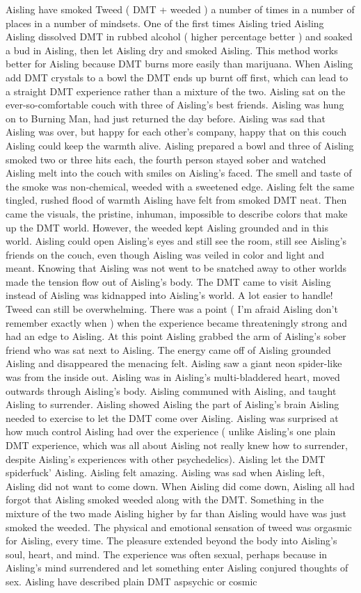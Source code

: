 \documentclass[12pt]{book}
\begin{document}
Aisling have smoked Tweed ( DMT + weeded ) a number of times in a number of places in a number of mindsets. One of the first times Aisling tried Aisling Aisling dissolved DMT in rubbed alcohol ( higher percentage better ) and soaked a bud in Aisling, then let Aisling dry and smoked Aisling. This method works better for Aisling because DMT burns more easily than marijuana. When Aisling add DMT crystals to a bowl the DMT ends up burnt off first, which can lead to a straight DMT experience rather than a mixture of the two. Aisling sat on the ever-so-comfortable couch with three of Aisling's best friends. Aisling was hung on to Burning Man, had just returned the day before. Aisling was sad that Aisling was over, but happy for each other's company, happy that on this couch Aisling could keep the warmth alive. Aisling prepared a bowl and three of Aisling smoked two or three hits each, the fourth person stayed sober and watched Aisling melt into the couch with smiles on Aisling's faced. The smell and taste of the smoke was non-chemical, weeded with a sweetened edge. Aisling felt the same tingled, rushed flood of warmth Aisling have felt from smoked DMT neat. Then came the visuals, the pristine, inhuman, impossible to describe colors that make up the DMT world. However, the weeded kept Aisling grounded and in this world. Aisling could open Aisling's eyes and still see the room, still see Aisling's friends on the couch, even though Aisling was veiled in color and light and meant. Knowing that Aisling was not went to be snatched away to other worlds made the tension flow out of Aisling's body. The DMT came to visit Aisling instead of Aisling was kidnapped into Aisling's world. A lot easier to handle! Tweed can still be overwhelming. There was a point ( I'm afraid Aisling don't remember exactly when ) when the experience became threateningly strong and had an edge to Aisling. At this point Aisling grabbed the arm of Aisling's sober friend who was sat next to Aisling. The energy came off of Aisling grounded Aisling and disappeared the menacing felt. Aisling saw a giant neon spider-like was from the inside out. Aisling was in Aisling's multi-bladdered heart, moved outwards through Aisling's body. Aisling communed with Aisling, and taught Aisling to surrender. Aisling showed Aisling the part of Aisling's brain Aisling needed to exercise to let the DMT come over Aisling. Aisling was surprised at how much control Aisling had over the experience ( unlike Aisling's one plain DMT experience, which was all about Aisling not really knew how to surrender, despite Aisling's experiences with other psychedelics). Aisling let the DMT spiderfuck' Aisling. Aisling felt amazing. Aisling was sad when Aisling left, Aisling did not want to come down. When Aisling did come down, Aisling all had forgot that Aisling smoked weeded along with the DMT. Something in the mixture of the two made Aisling higher by far than Aisling would have was just smoked the weeded. The physical and emotional sensation of tweed was orgasmic for Aisling, every time. The pleasure extended beyond the body into Aisling's soul, heart, and mind. The experience was often sexual, perhaps because in Aisling's mind surrendered and let something enter Aisling conjured thoughts of sex. Aisling have described plain DMT aspsychic or cosmic 
\end{document}
